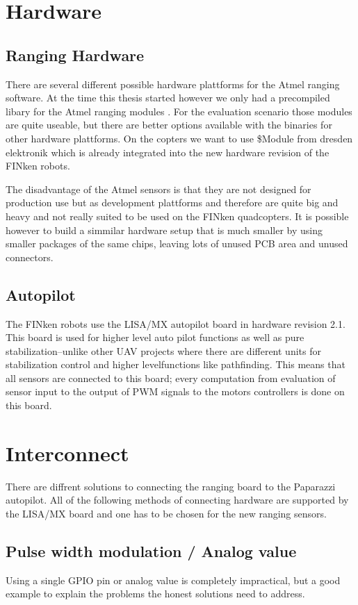 \section{Hardware}

\subsection{Ranging Hardware}

There are several different possible hardware plattforms for the Atmel ranging software.
At the time this thesis started however we only had a precompiled libary for the Atmel ranging modules .
For the evaluation scenario those modules are quite useable, but there are better options available with the binaries for other hardware plattforms.
On the copters we want to use \$Module from dresden elektronik which is already integrated into the new hardware revision of the FINken robots.

The disadvantage of the Atmel sensors is that they are not designed for production use but as development plattforms and therefore are quite big and heavy and not really suited to be used on the FINken quadcopters.
It is possible however to build a simmilar hardware setup that is much smaller by using smaller packages of the same chips, leaving lots of unused PCB area and unused connectors.

\subsection{Autopilot}
The FINken robots use the LISA/MX autopilot board in hardware revision 2.1.
This board is used for higher level auto pilot functions as well as pure stabilization–unlike other UAV projects where there are different units for stabilization control and higher levelfunctions like pathfinding.
This means that all sensors are connected to this board; every computation from evaluation of sensor input to the output of PWM signals to the motors controllers is done on this board.

\section{Interconnect}
There are diffrent solutions to connecting the ranging board to the Paparazzi autopilot.
All of the following methods of connecting hardware are supported by the LISA/MX board and one has to be chosen for the new ranging sensors.


\subsection{Pulse width modulation / Analog value}
Using a single GPIO pin or analog value is completely impractical, but a good example to explain the problems the honest solutions need to address.

